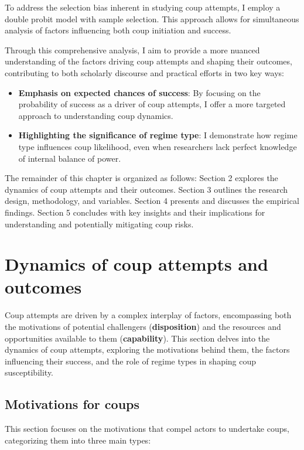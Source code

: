 \documentclass[
  12pt,
]{report}
\begin{document}
To address the selection bias inherent in studying coup attempts, I
employ a double probit model with sample selection. This approach allows
for simultaneous analysis of factors influencing both coup initiation
and success.

Through this comprehensive analysis, I aim to provide a more nuanced
understanding of the factors driving coup attempts and shaping their
outcomes, contributing to both scholarly discourse and practical efforts
in two key ways:

\begin{itemize}
\item
  \textbf{Emphasis on expected chances of success}: By focusing on the
  probability of success as a driver of coup attempts, I offer a more
  targeted approach to understanding coup dynamics.
\item
  \textbf{Highlighting the significance of regime type}: I demonstrate
  how regime type influences coup likelihood, even when researchers lack
  perfect knowledge of internal balance of power.
\end{itemize}

The remainder of this chapter is organized as follows: Section 2
explores the dynamics of coup attempts and their outcomes. Section 3
outlines the research design, methodology, and variables. Section 4
presents and discusses the empirical findings. Section 5 concludes with
key insights and their implications for understanding and potentially
mitigating coup risks.

\section{Dynamics of coup attempts and
outcomes}\label{dynamics-of-coup-attempts-and-outcomes}

Coup attempts are driven by a complex interplay of factors, encompassing
both the motivations of potential challengers (\textbf{disposition}) and
the resources and opportunities available to them (\textbf{capability}).
This section delves into the dynamics of coup attempts, exploring the
motivations behind them, the factors influencing their success, and the
role of regime types in shaping coup susceptibility.

\subsection{Motivations for coups}\label{motivations-for-coups}

This section focuses on the motivations that compel actors to undertake
coups, categorizing them into three main types:
\end{document}
